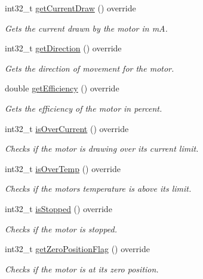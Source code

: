 \begin{DoxyCompactItemize}
int32\+\_\+t \mbox{\hyperlink{classokapi_1_1MockMotor_a907f0f9dd292b8685581be6989588430}{get\+Current\+Draw}} () override
\begin{DoxyCompactList}\small\item\em Gets the current drawn by the motor in mA. \end{DoxyCompactList}\item 
int32\+\_\+t \mbox{\hyperlink{classokapi_1_1MockMotor_a06859db144b150efe6d0156d7b69aa17}{get\+Direction}} () override
\begin{DoxyCompactList}\small\item\em Gets the direction of movement for the motor. \end{DoxyCompactList}\item 
double \mbox{\hyperlink{classokapi_1_1MockMotor_adebb84d5230d71b1d0cee5f4c5de9a5f}{get\+Efficiency}} () override
\begin{DoxyCompactList}\small\item\em Gets the efficiency of the motor in percent. \end{DoxyCompactList}\item 
int32\+\_\+t \mbox{\hyperlink{classokapi_1_1MockMotor_a73372bc2b71a7745c281245a6b37e14a}{is\+Over\+Current}} () override
\begin{DoxyCompactList}\small\item\em Checks if the motor is drawing over its current limit. \end{DoxyCompactList}\item 
int32\+\_\+t \mbox{\hyperlink{classokapi_1_1MockMotor_af8475d8e872bb902e9d860e8b9950e1a}{is\+Over\+Temp}} () override
\begin{DoxyCompactList}\small\item\em Checks if the motor\textquotesingle{}s temperature is above its limit. \end{DoxyCompactList}\item 
int32\+\_\+t \mbox{\hyperlink{classokapi_1_1MockMotor_a169f019d8567baf80ec75c43c95edbd8}{is\+Stopped}} () override
\begin{DoxyCompactList}\small\item\em Checks if the motor is stopped. \end{DoxyCompactList}\item 
int32\+\_\+t \mbox{\hyperlink{classokapi_1_1MockMotor_aaf19a2d2c9cec497a84e5862a3948d7d}{get\+Zero\+Position\+Flag}} () override
\begin{DoxyCompactList}\small\item\em Checks if the motor is at its zero position. \end{DoxyCompactList}\item 

\end{DoxyCompactItemize}
